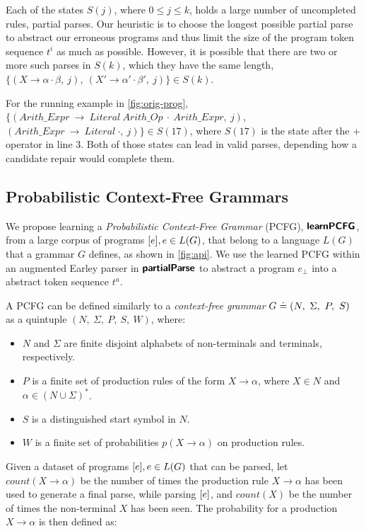  Each of the states $S(j)$, where $0
\leq j \leq k$, holds a large number of uncompleted rules, \ie partial parses.
Our heuristic is to choose the longest possible partial parse to abstract our
erroneous programs and thus limit the size of the program token sequence $t^i$
as much as possible. However, it is possible that there are two or more such
parses in $S(k)$, which they have the same length, \eg $\{(X \rightarrow \alpha
\cdot \beta,\ j),\ (X' \rightarrow \alpha' \cdot \beta',\ j)\} \in S(k)$.


 For the running example in \autoref{fig:orig-prog},
$\{(Arith\_Expr\ \rightarrow\ Literal\ Arith\_Op\ \cdot\ Arith\_Expr,\ j)$,
$(Arith\_Expr\ \rightarrow\ Literal\ \cdot,\ j)\} \in S(17)$, where $S(17)$ is
the state after the $+$ operator in line 3. Both of those states can lead in
valid parses, depending how a candidate repair would complete them.


\subsection{Probabilistic Context-Free Grammars}
\label{sec:prog-abstract:pcfg}
We propose learning a \emph{Probabilistic Context-Free Grammar} (PCFG),
$\bm{\mathsf{learnPCFG}}$, from a large corpus of programs $[e], e \in L(G)$, that
belong to a language $L(G)$ that a grammar $G$ defines, as shown in
\autoref{fig:api}. We use the learned PCFG within an augmented Earley parser in
$\bm{\mathsf{partialParse}}$ to abstract a program $e_{\bot}$ into a abstract token sequence
$t^a$.

A PCFG can be defined similarly to a \emph{context-free grammar} $G \doteq (N,\
\Sigma,\ P,\ S)$ as a quintuple $(N,\ \Sigma,\ P,\ S,\ W)$, where:
\begin{itemize}
    \item $N$ and $\Sigma$ are finite disjoint alphabets of non-terminals and
    terminals, respectively.
    \item $P$ is a finite set of production rules of the form $X \rightarrow
    \alpha$, where $X \in N$ and $\alpha \in (N \cup \Sigma)^{\ast}$.
    \item $S$ is a distinguished start symbol in $N$.
    \item $W$ is a finite set of probabilities $p(X \rightarrow \alpha)$ on
    production rules.
\end{itemize}

Given a dataset of programs $[e], e \in L(G)$ that can be parsed, let
$count(X \rightarrow \alpha)$ be the number of times the production rule $X
\rightarrow \alpha$ has been used to generate a final parse, while parsing
$[e]$, and $count(X)$ be the number of times the non-terminal $X$ has been
seen. The probability for a production $X \rightarrow \alpha$ is then defined
as:

